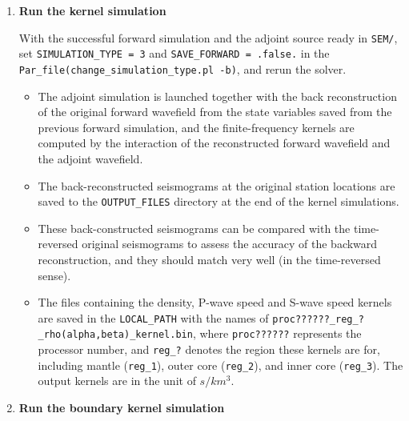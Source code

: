 \documentclass[oneside,english]{book}
\newenvironment{lyxcode}
{\begin{list}{}{
\setlength{\rightmargin}{\leftmargin}
\setlength{\listparindent}{0pt}%
\raggedright
\setlength{\itemsep}{0pt}
\setlength{\parsep}{0pt}
\normalfont\ttfamily}%
 \item[]}
{\end{list}}
\begin{document}
\begin{enumerate}

\item \textbf{Run the kernel simulation}


With the successful forward simulation and the adjoint source ready
in \texttt{SEM/}, set \texttt{SIMULATION\_TYPE = 3} and \texttt{SAVE\_FORWARD
= .false.} in the \texttt{Par\_file(change\_simulation\_type.pl -b)},
and rerun the solver.

\begin{itemize}
\item The adjoint simulation is launched together with the back reconstruction
of the original forward wavefield from the state variables saved from
the previous forward simulation, and the finite-frequency kernels
are computed by the interaction of the reconstructed forward wavefield
and the adjoint wavefield.
\item The back-reconstructed seismograms at the original station locations
are saved to the \texttt{OUTPUT\_FILES} directory at the end of the
kernel simulations.
\item These back-constructed seismograms can be compared with the time-reversed
original seismograms to assess the accuracy of the backward reconstruction,
and they should match very well (in the time-reversed sense).
\item The files containing the density, P-wave speed and S-wave speed kernels
are saved in the \texttt{LOCAL\_PATH} with the names of \texttt{proc??????\_reg\_?\_rho(alpha,beta)\_kernel.bin},
where \texttt{proc??????} represents the processor number, and \texttt{reg\_?}
denotes the region these kernels are for, including mantle (\texttt{reg\_1}),
outer core (\texttt{reg\_2}), and inner core (\texttt{reg\_3}). The
output kernels are in the unit of $s/km^{3}$.
\end{itemize}
\item \textbf{Run the boundary kernel simulation}



\end{enumerate}
\end{document}
